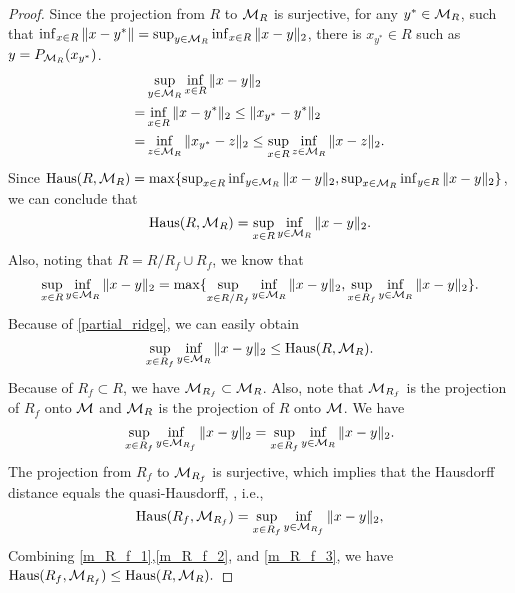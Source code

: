 \documentclass[aos,preprint]{imsart}
\theoremstyle{remark}
\begin{document}
\begin{appendix}
\begin{proof}\label{Transformed Inequality}
Since the projection from $R$ to ${\cal M}_{R}$ is surjective, for any $y^*\in {\cal M}_{R}$, such that
$\inf_{x\in R} \|x-y^*\| = \sup_{y\in {\cal M}_R} \inf_{x\in R}\|x-y\|_2$, there is $x_{y^*}\in R$ such as $y = P_{{\cal M}_R}(x_{y^*})$. 
\[
\begin{aligned}
&\sup_{y\in {\cal M}_R} \inf_{x\in R}\|x-y\|_2 \\
=&\inf_{x\in R} \|x-y^*\|_2 \leq \|x_{y^*} - y^*\|_2 \\
= &\inf_{z\in{\cal M}_R }\|x_{y^*}-z\|_2 \leq \sup_{x\in R}\inf_{z\in{\cal M}_R }\|x-z\|_2.
\end{aligned}
\]
Since ${\rm Haus} (R, {\cal M}_{R}) = \max \{\sup_{x\in R} \inf_{y\in {\cal M}_R} \|x-y\|_2, \sup_{x\in {\cal M}_R} \inf_{y\in R} \|x-y\|_2\}$, we can conclude that
\[
{\rm Haus} (R, {\cal M}_{R}) = \sup_{x\in R} \inf_{y\in {\cal M}_R} \|x-y\|_2.
\]
Also, noting that $R = R/R_f\cup R_f$, we know that
\begin{equation}\label{partial_ridge}
\sup_{x\in R} \inf_{y\in {\cal M}_R} \|x-y\|_2 = \max\{\sup_{x\in R/R_f} \inf_{y\in {\cal M}_R} \|x-y\|_2, \sup_{x\in R_f} \inf_{y\in {\cal M}_R} \|x-y\|_2 \}.
\end{equation}
Because of \eqref{partial_ridge}, we can easily obtain
\begin{equation}\label{m_R_f_1}
\sup_{x\in R_f} \inf_{y\in {\cal M}_R} \|x-y\|_2 \leq {\rm Haus} (R, {\cal M}_{R}).
\end{equation}
Because of $R_f\subset R$,  we have ${\cal M}_{R_f}\subset {\cal M}_R$.  Also, note that ${\cal M}_{R_f}$ is the projection of $R_f$ onto $\cal M$ and ${\cal M}_R$ is the projection of $R$ onto $\cal M$. We have
\begin{equation}\label{m_R_f_2}
\sup_{x\in R_f} \inf_{y\in {\cal M}_{R_f}} \|x-y\|_2=\sup_{x\in R_f} \inf_{y\in {\cal M}_R} \|x-y\|_2.
\end{equation}
The projection from $R_f$ to ${\cal M}_{R_f}$ is surjective, which implies that the Hausdorff distance equals the quasi-Hausdorff, \cite{chen2015asymptotic}, i.e., 
\begin{equation}\label{m_R_f_3}
{\rm Haus} (R_f, {\cal M}_{R_f}) = \sup_{x\in R_f} \inf_{y\in {\cal M}_{R_f}} \|x-y\|_2,
\end{equation}
Combining \eqref{m_R_f_1},\eqref{m_R_f_2}, and \eqref{m_R_f_3}, we have
$
{\rm Haus} (R_f, {\cal M}_{R_f}) \leq {\rm Haus} (R, {\cal M}_{R}).
$
\end{proof}

\end{appendix}



%


\end{document}
